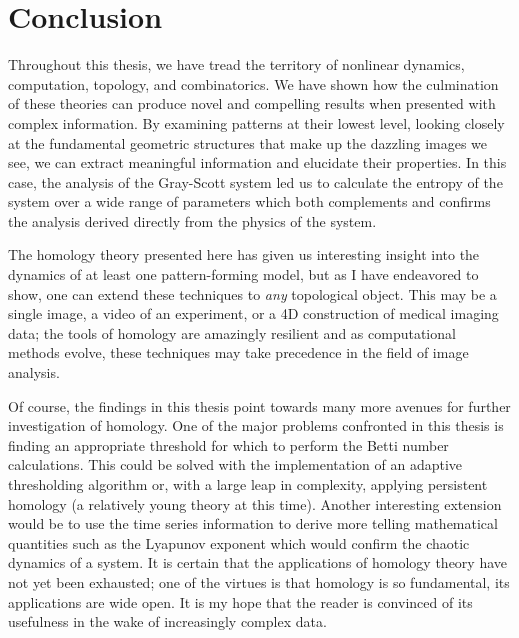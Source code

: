 \chapter*{Conclusion}
	\setcounter{chapter}{4}
	\setcounter{section}{0}
	
Throughout this thesis, we have tread the territory of nonlinear dynamics, computation, topology, and combinatorics. We have shown how the culmination of these theories can produce novel and compelling results when presented with complex information. By examining patterns at their lowest level, looking closely at the fundamental geometric structures that make up the dazzling images we see, we can extract meaningful information and elucidate their properties. In this case, the analysis of the Gray-Scott system led us to calculate the entropy of the system over a wide range of parameters which both complements and confirms the analysis derived directly from the physics of the system.

The homology theory presented here has given us interesting insight into the dynamics of at least one pattern-forming model, but as I have endeavored to show, one can extend these techniques to \textit{any} topological object. This may be a single image, a video of an experiment, or a 4D construction of medical imaging data; the tools of homology are amazingly resilient and as computational methods evolve, these techniques may take precedence in the field of image analysis.

Of course, the findings in this thesis point towards many more avenues for further investigation of homology. One of the major problems confronted in this thesis is finding an appropriate threshold for which to perform the Betti number calculations. This could be solved with the implementation of an adaptive thresholding algorithm or, with a large leap in complexity, applying persistent homology (a relatively young theory at this time). Another interesting extension would be to use the time series information to derive more telling mathematical quantities such as the Lyapunov exponent which would confirm the chaotic dynamics of a system. It is certain that the applications of homology theory have not yet been exhausted; one of the virtues is that homology is so fundamental, its applications are wide open. It is my hope that the reader is convinced of its usefulness in the wake of increasingly complex data.